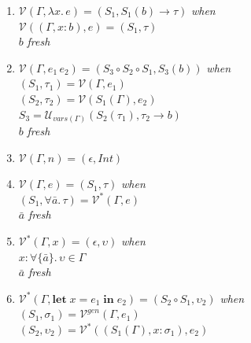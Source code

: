 \documentclass{article}
\begin{document}
\begin{enumerate}
\item[(1)] $\mathcal{V}(\Gamma, \lambda x.\, e) = (S_1, S_1(b) \to \tau)$ \textit{when} \\
           \hspace*{2em} $\mathcal{V}((\Gamma, x\!:\!b), e) = (S_1, \tau)$ \\
           \hspace*{2em} $b$ \textit{fresh}


\item[(2)] $\mathcal{V}(\Gamma, e_1\,e_2) = (S_3 \circ S_2 \circ S_1, S_3(b))$ \textit{when} \\
           \hspace*{2em} $(S_1, \tau_1) = \mathcal{V}(\Gamma, e_1)$ \\
           \hspace*{2em} $(S_2, \tau_2) = \mathcal{V}(S_1(\Gamma), e_2)$ \\
           \hspace*{2em} $S_3 = \mathcal{U}_{\mathit{vars}(\Gamma)}(S_2(\tau_1), \tau_2 \to b)$ \\
           \hspace*{2em} $b$ \textit{fresh}


\item[(3)] $\mathcal{V}(\Gamma, n) = (\epsilon, \mathit{Int})$


\item[(4)] $\mathcal{V}(\Gamma, e) = (S_1, \tau)$ \textit{when} \\
           \hspace*{2em} $(S_1, \forall\bar{a}.\,\tau) = \mathcal{V}^*(\Gamma, e)$ \\
           \hspace*{2em} $\bar{a}$ \textit{fresh}


\item[(5)] $\mathcal{V}^*(\Gamma, x) = (\epsilon, \upsilon)$ \textit{when} \\
           \hspace*{2em} $x : \forall\{\bar{a}\}.\,\upsilon \in \Gamma$ \\
           \hspace*{2em} $\bar{a}$ \textit{fresh}
\item[(6)] $\mathcal{V}^*(\Gamma, \mathbf{let}\; x = e_1\; \mathbf{in}\; e_2) = (S_2 \circ S_1, \upsilon_2)$ \textit{when} \\           \hspace*{2em} $(S_1, \sigma_1) = \mathcal{V}^{gen}(\Gamma, e_1)$ \\
           \hspace*{2em} $(S_2, \upsilon_2) = \mathcal{V}^*((S_1(\Gamma), x\!:\!\sigma_1), e_2)$



\end{enumerate}
\end{document}
